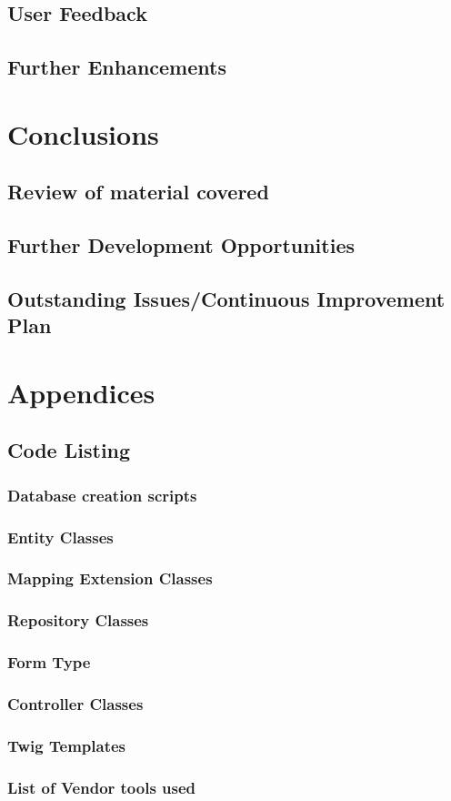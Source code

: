 \documentclass[a4paper,12pt]{article}
\begin{document}
\subsection {User Feedback}
\subsection {Further Enhancements}

\section {Conclusions}
\subsection {Review of material covered }
\subsection {Further Development Opportunities}
\subsection {Outstanding Issues/Continuous Improvement Plan}

\section {Appendices}
\subsection {Code Listing}

\subsubsection {Database creation scripts}
\subsubsection {Entity Classes}
\subsubsection {Mapping Extension Classes}
\subsubsection {Repository Classes}
\subsubsection {Form Type}
\subsubsection {Controller Classes}
\subsubsection {Twig Templates}
\subsubsection {List of Vendor tools used}
\end{document}
